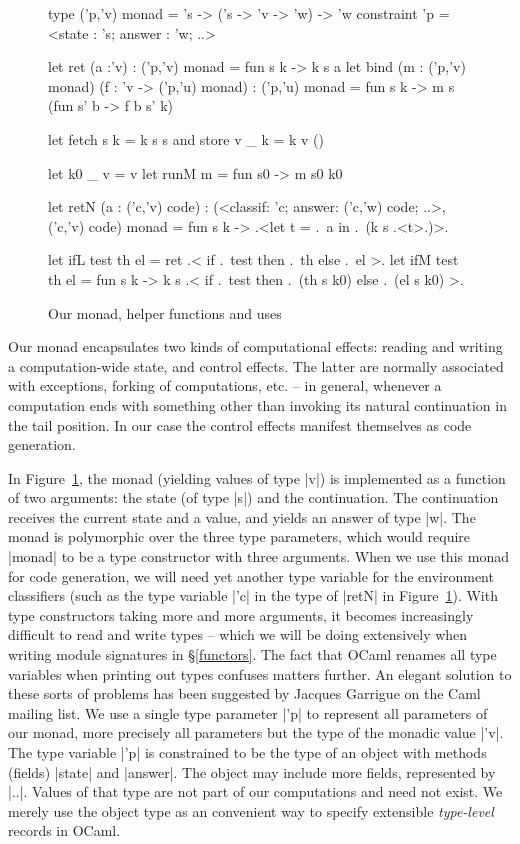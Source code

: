 \documentclass{elsart}
\begin{document}
\begin{figure}
\begin{code}
type ('p,'v) monad = 's -> ('s -> 'v -> 'w) -> 'w
    constraint 'p = <state : 's; answer : 'w; ..>

let ret (a :'v) : ('p,'v) monad = fun s k -> k s a
let bind (m : ('p,'v) monad) (f : 'v -> ('p,'u) monad) : ('p,'u) monad
  = fun s k -> m s (fun s' b -> f b s' k)

let fetch s k = k s s  and  store v _ k = k v ()

let k0 _ v = v
let runM m = fun s0 -> m s0 k0 

let retN (a : ('c,'v) code) : 
 (<classif: 'c; answer: ('c,'w) code; ..>,('c,'v) code) monad 
   = fun s k -> .<let t = .~a in .~(k s .<t>.)>.

let ifL test th el = ret .< if .~test then .~th else .~el >.
let ifM test th el = fun s k -> 
  k s .< if .~test then .~(th s k0) else .~(el s k0) >.
\end{code}
\caption{Our monad, helper functions and uses}\label{ourmonad}
\end{figure}

Our monad encapsulates two kinds of computational effects: reading and
writing a computation-wide state, and control effects. The latter are
normally associated with exceptions, forking of computations, etc. --
in general, whenever a computation ends with something other than
invoking its natural continuation in the tail position. In our case
the control effects manifest themselves as code generation.

In Figure~\ref{ourmonad}, the monad (yielding values of type |v|)
is implemented as a function of two
arguments: the state (of type |s|) and the continuation. The
continuation receives the current state and a value, and
yields an answer of type |w|.  The monad is polymorphic over the
three type parameters, which would require |monad| to be a type
constructor with three arguments. When we use this monad for code
generation, we will need yet another type variable for the environment
classifiers \cite{taha-environment} (such as the type variable |'c| 
in the type of |retN| in Figure~\ref{ourmonad}).
With type constructors taking more
and more arguments, it becomes increasingly difficult to read and write
types -- which we will be doing extensively when writing module
signatures in \S\ref{functors}. The fact that OCaml renames all type
variables when printing out types confuses matters further. An elegant
solution to these sorts of problems has been suggested by 
Jacques Garrigue on the Caml mailing list.
%
We use a single type parameter |'p| to represent all parameters of our monad,
more precisely all parameters but the type of
the monadic value |'v|. The type variable |'p| is constrained to be
the type of an object with methods (fields) |state| and |answer|. The
object may include more fields, represented by |..|. Values of that
type are not part of our computations and need not exist. We merely
use the object type as an convenient way to specify extensible
\emph{type-level} records in OCaml.     
\end{document}
